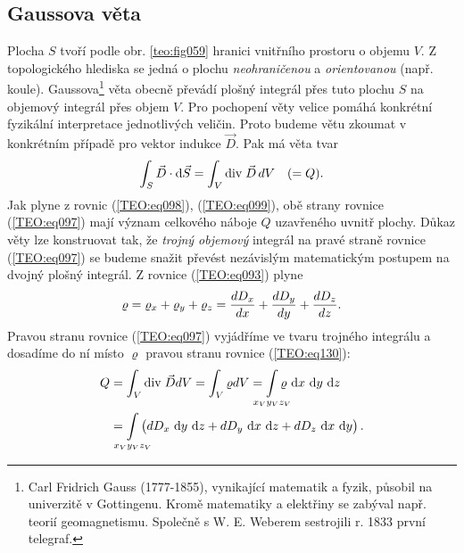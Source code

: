     \subsection{Gaussova věta}
      Plocha \(S\) tvoří podle obr. \ref{teo:fig059} hranici vnitřního prostoru o
      objemu \(V\). Z topologického hlediska se jedná o plochu \emph{neohraničenou} a
      \emph{orientovanou} (např. koule). Gaussova\footnote{Carl Fridrich Gauss (1777-1855),
      vynikající matematik a fyzik, působil na univerzitě v Gottingenu. Kromě matematiky a elektřiny
      se zabýval např. teorií geomagnetismu. Společně s W. E. Weberem sestrojili r. 1833 první
      telegraf.}  věta obecně převádí plošný integrál přes tuto plochu \(S\) na objemový integrál
      přes objem \(V\). Pro pochopení věty velice pomáhá konkrétní fyzikální interpretace
      jednotlivých veličin. Proto budeme větu zkoumat v konkrétním případě pro vektor indukce
      \(\vec{D}\). Pak má věta tvar
      \begin{equation}\label{TEO:eq097}
        \int_S\vec{D}\cdot \mathop{}\!\mathrm{d}\vec{S} = \int_V\mathrm{div}\;\vec{D}\,dV \quad(=Q).
      \end{equation} 
      Jak plyne z rovnic (\ref{TEO:eq098}), (\ref{TEO:eq099}), obě strany rovnice (\ref{TEO:eq097})
      mají význam celkového náboje \(Q\) uzavřeného uvnitř plochy. Důkaz věty lze konstruovat tak,
      že \emph{trojný objemový} integrál na pravé straně rovnice (\ref{TEO:eq097}) se budeme snažit
      převést nezávislým matematickým postupem na dvojný plošný integrál. Z rovnice
      (\ref{TEO:eq093}) plyne
      \begin{equation}\label{TEO:eq130}
        \varrho = \varrho_x + \varrho_y + \varrho_z 
                = \dfrac{d D_x}{d x} + \dfrac{d D_y}{d y} + \dfrac{d D_z}{d z}. 
      \end{equation}
      Pravou stranu rovnice (\ref{TEO:eq097}) vyjádříme ve tvaru trojného integrálu a 
      dosadíme do ní místo \(\varrho\) pravou stranu rovnice (\ref{TEO:eq130}):
      \begin{align}\label{TEO:eq096}
        Q &= \int_V\diver{D}dV = \int_V\varrho dV 
           = \limitint_{\mathclap{x_Vy_Vz_V}}\varrho\,\dd{x}\,\dd{y}\,\dd{z}   \nonumber\\
          &= \limitint_{\mathclap{x_Vy_Vz_V}}
             \left(dD_x\,\dd{y}\,\dd{z}+dD_y\,\dd{x}\,\dd{z}+dD_z\,\dd{x}\,\dd{y}\right).
      \end{align}    
      

